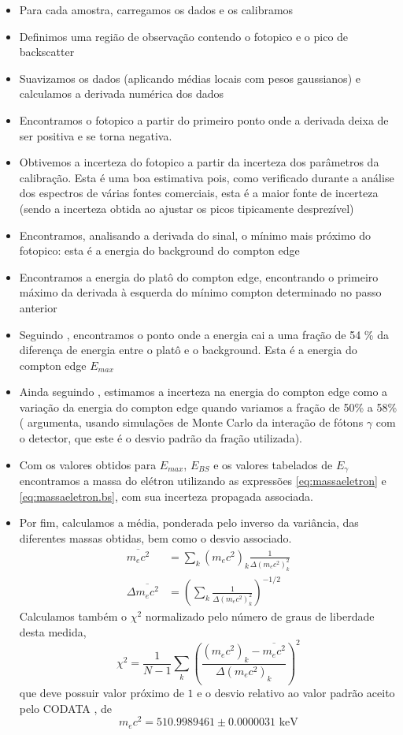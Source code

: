 \documentclass[a4paper, 11pt, notitlepage]{article}
\numberwithin{equation}{section}  %
\begin{document}
\begin{itemize}
  \item Para cada amostra, carregamos os dados e os calibramos
  \item Definimos uma região de observação contendo o fotopico e o pico de backscatter
  \item Suavizamos os dados (aplicando médias locais com pesos gaussianos) e calculamos a derivada numérica dos dados
  \item Encontramos o fotopico a partir do primeiro ponto onde a derivada deixa de ser positiva e se torna negativa.
  \item Obtivemos a incerteza do fotopico a partir da incerteza dos parâmetros da calibração. Esta é uma boa estimativa pois, como verificado durante a análise dos espectros de várias fontes comerciais, esta é a maior fonte de incerteza (sendo a incerteza obtida ao ajustar os picos tipicamente desprezível)
  \item Encontramos, analisando a derivada do sinal, o mínimo mais próximo do fotopico: esta é a energia do background do compton edge
  \item Encontramos a energia do platô do compton edge, encontrando o primeiro máximo da derivada à esquerda do mínimo compton determinado no passo anterior
  \item Seguindo \cite{jolivette1994}, encontramos o ponto onde a energia cai a uma fração de 54 \% da diferença de energia entre o platô e o background. Esta é a energia do compton edge $E_{max}$
  \item Ainda seguindo \cite{jolivette1994}, estimamos a incerteza na energia do compton edge como a variação da energia do compton edge quando variamos a fração de 50\% a 58\% (\cite{jolivette1994} argumenta, usando simulações de Monte Carlo da interação de fótons $\gamma$ com o detector, que este é o desvio padrão da fração utilizada).
  \item Com os valores obtidos para $E_{max}$, $E_{BS}$ e os valores tabelados de $E_{\gamma}$ encontramos a massa do elétron utilizando as expressões \eqref{eq:massaeletron} e \eqref{eq:massaeletron.bs}, com sua incerteza propagada associada.
  \item Por fim, calculamos a média, ponderada pelo inverso da variância, das diferentes massas obtidas, bem como o desvio associado.
  \begin{eqnarray*}
  \overline{m_ec^2} &= \sum_{k} (m_e c^2)_k \frac{1}{\Delta (m_e c^2)_k^2} \\
  \Delta \overline{m_e c^2} &= \left(\sum_{k} \frac{1}{\Delta (m_e c^2)_k^2}\right)^{-1/2}
  \end{eqnarray*}
  Calculamos também o $\chi^2$ normalizado pelo número de graus de liberdade desta medida,
  \[
  \chi^2 = \frac{1}{N-1}\sum_k\left(\frac{(m_ec^2 )_k - \overline{m_ec^2}}{\Delta (m_e c^2)_k}\right)^2
  \]
  \noindent que deve possuir valor próximo de $1$ e o desvio relativo ao valor padrão aceito pelo CODATA \cite{codata2014}, de 
  \[
  m_e c^2 = 510.9989461 \pm 0.0000031\text{ keV}
  \]
\end{itemize}
\end{document}
